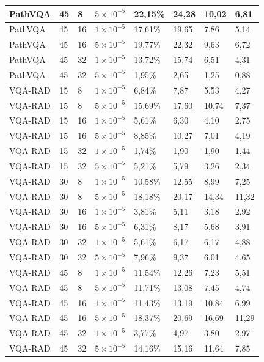 \begin{longtable}[c]{|l|l|l|l|l|l|l|l|}
  PathVQA & 45 & 8  & $5 \times 10^{-5}$ & 22,15\% & 24,28 & 10,02 & 6,81  \\ \hline
  PathVQA & 45 & 16 & $1 \times 10^{-5}$ & 17,61\% & 19,65 & 7,86  & 5,14  \\ \hline
  PathVQA & 45 & 16 & $5 \times 10^{-5}$ & 19,77\% & 22,32 & 9,63  & 6,72  \\ \hline
  PathVQA & 45 & 32 & $1 \times 10^{-5}$ & 13,72\% & 15,74 & 6,51  & 4,31  \\ \hline
  PathVQA & 45 & 32 & $5 \times 10^{-5}$ & 1,95\%  & 2,65  & 1,25  & 0,88  \\ \hline
  VQA-RAD & 15 & 8  & $1 \times 10^{-5}$ & 6,84\%  & 7,87  & 5,53  & 4,27  \\ \hline
  VQA-RAD & 15 & 8  & $5 \times 10^{-5}$ & 15,69\% & 17,60 & 10,74 & 7,37  \\ \hline
  VQA-RAD & 15 & 16 & $1 \times 10^{-5}$ & 5,61\%  & 6,30  & 4,10  & 2,75  \\ \hline
  VQA-RAD & 15 & 16 & $5 \times 10^{-5}$ & 8,85\%  & 10,27 & 7,01  & 4,19  \\ \hline
  VQA-RAD & 15 & 32 & $1 \times 10^{-5}$ & 1,74\%  & 1,90  & 1,90  & 1,44  \\ \hline
  VQA-RAD & 15 & 32 & $5 \times 10^{-5}$ & 5,21\%  & 5,79  & 3,26  & 2,34  \\ \hline
  VQA-RAD & 30 & 8  & $1 \times 10^{-5}$ & 10,58\% & 12,55 & 8,99  & 7,25  \\ \hline
  VQA-RAD & 30 & 8  & $5 \times 10^{-5}$ & 18,18\% & 20,17 & 14,34 & 11,32 \\ \hline
  VQA-RAD & 30 & 16 & $1 \times 10^{-5}$ & 3,81\%  & 5,11  & 3,18  & 2,92  \\ \hline
  VQA-RAD & 30 & 16 & $5 \times 10^{-5}$ & 6,31\%  & 8,17  & 5,68  & 3,91  \\ \hline
  VQA-RAD & 30 & 32 & $1 \times 10^{-5}$ & 5,61\%  & 6,17  & 6,17  & 4,88  \\ \hline
  VQA-RAD & 30 & 32 & $5 \times 10^{-5}$ & 7,96\%  & 9,37  & 6,01  & 4,65  \\ \hline
  VQA-RAD & 45 & 8  & $1 \times 10^{-5}$ & 11,54\% & 12,26 & 7,23  & 5,51  \\ \hline
  VQA-RAD & 45 & 8  & $5 \times 10^{-5}$ & 11,71\% & 13,08 & 7,45  & 4,74  \\ \hline
  VQA-RAD & 45 & 16 & $1 \times 10^{-5}$ & 11,43\% & 13,19 & 10,84 & 6,99  \\ \hline
  VQA-RAD & 45 & 16 & $5 \times 10^{-5}$ & 18,37\% & 20,69 & 16,69 & 11,29 \\ \hline
  VQA-RAD & 45 & 32 & $1 \times 10^{-5}$ & 3,77\%  & 4,97  & 3,80  & 2,97  \\ \hline
  VQA-RAD & 45 & 32 & $5 \times 10^{-5}$ & 14,16\% & 15,16 & 11,64 & 7,85  \\ \hline
  \end{longtable}


